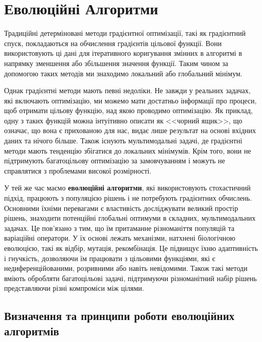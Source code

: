 
\chapter{Еволюційні Алгоритми}
\label{chap:review}  %


Традиційні детерміновані методи градієнтної оптимізації, такі як 
градієнтний спуск, покладаються на обчислення градієнтів цільової функції.
Вони використовують ці дані для ітеративного 
коригування змінних в алгоритмі в напрямку зменшення або збільшення значення функції.
Таким чином за допомогою таких методів ми знаходимо локальний або глобальний мінімум.

Однак градієнтні методи мають певні недоліки.
Не завжди у реальних задачах, які включають оптимізацію, ми можемо мати достатньо
інформації про процеси, щоб отримати цільову функцію, над якою проводимо оптимізацію.
Як приклад, одну з таких функцій можна інтуітивно описати як <<чорний ящик>>, 
що означає, що вона є прихованою для нас, видає лише результат на 
основі вхідних даних та нічого більше.
Також існують мультимодальні задачі, де градієнтні методи мають тенденцію 
збігатися до локальних мінімумів.
Крім того, вони не підтримують багатоцільову оптимізацію за замовчуванням 
і можуть не справлятися з проблемами високої розмірності.

У тей же час маємо \textbf{еволюційні алгоритми}, які використовують 
стохастичний підхід, працюють з популяцією рішень і не потребують
градієнтних обчислень.
Основними їхніми перевагами є властивість досліджувати великий простір рішень,
знаходити потенційні глобальні оптимуми в складних, мультимодальних задачах.
Це пов'язано з тим, що їм притаманне різноманіття популяцій
та варіаційні оператори.
У їх основі лежать механізми, натхнені біологічною еволюцією, такі як відбір,
мутація, рекомбінація.
Це підвищує їхню адаптивність і гнучкість, дозволяючи їм працювати з цільовими 
функціями, які є недиференційованими, розривними або навіть невідомими.
Також такі методи вміють обробляти багатоцільові задачі,
підтримуючи різноманітний набір рішень представляючи
різні компроміси між цілями.


\section{Визначення та принципи роботи еволюційних алгоритмів}

